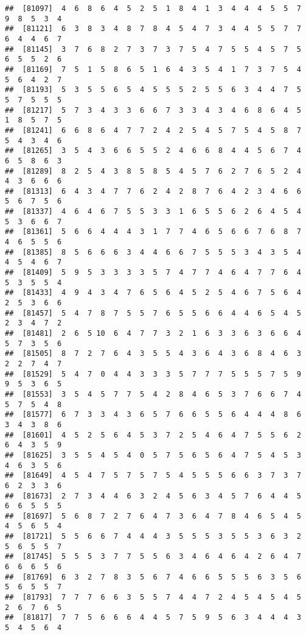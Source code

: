\documentclass[
]{book}
\begin{document}
\begin{verbatim}
##  [81097]  4  6  8  6  4  5  2  5  1  8  4  1  3  4  4  4  5  5  7  9  8  5  3  4
##  [81121]  6  3  8  3  4  8  7  8  4  5  4  7  3  4  4  5  5  7  7  6  4  4  6  7
##  [81145]  3  7  6  8  2  7  3  7  3  7  5  4  7  5  5  4  5  7  5  6  5  5  2  6
##  [81169]  7  5  1  5  8  6  5  1  6  4  3  5  4  1  7  3  7  5  4  5  6  4  2  7
##  [81193]  5  3  5  5  6  5  4  5  5  5  2  5  5  6  3  4  4  7  5  5  7  5  5  5
##  [81217]  5  7  3  4  3  3  6  6  7  3  3  4  3  4  6  8  6  4  5  1  8  5  7  5
##  [81241]  6  6  8  6  4  7  7  2  4  2  5  4  5  7  5  4  5  8  7  5  4  3  4  6
##  [81265]  3  5  4  3  6  6  5  5  2  4  6  6  8  4  4  5  6  7  4  6  5  8  6  3
##  [81289]  8  2  5  4  3  8  5  8  5  4  5  7  6  2  7  6  5  2  4  4  3  6  6  6
##  [81313]  6  4  3  4  7  7  6  2  4  2  8  7  6  4  2  3  4  6  6  5  6  7  5  6
##  [81337]  4  6  4  6  7  5  5  3  3  1  6  5  5  6  2  6  4  5  4  5  3  6  6  7
##  [81361]  5  6  6  4  4  4  3  1  7  7  4  6  5  6  6  7  6  8  7  4  6  5  5  6
##  [81385]  8  5  6  6  6  3  4  4  6  6  7  5  5  5  3  4  3  5  4  4  5  4  6  7
##  [81409]  5  9  5  3  3  3  3  5  7  4  7  7  4  6  4  7  7  6  4  5  3  5  5  4
##  [81433]  4  9  4  3  4  7  6  5  6  4  5  2  5  4  6  7  5  6  4  2  5  3  6  6
##  [81457]  5  4  7  8  7  5  5  7  6  5  5  6  6  4  4  6  5  4  5  2  3  4  7  2
##  [81481]  2  6  5 10  6  4  7  7  3  2  1  6  3  3  6  3  6  6  4  5  7  3  5  6
##  [81505]  8  7  2  7  6  4  3  5  5  4  3  6  4  3  6  8  4  6  3  2  2  7  4  7
##  [81529]  5  4  7  0  4  4  3  3  3  5  7  7  7  5  5  5  7  5  9  9  5  3  6  5
##  [81553]  3  5  4  5  7  7  5  4  2  8  4  6  5  3  7  6  6  7  4  5  7  5  4  8
##  [81577]  6  7  3  3  4  3  6  5  7  6  6  5  5  6  4  4  4  8  6  3  4  3  8  6
##  [81601]  4  5  2  5  6  4  5  3  7  2  5  4  6  4  7  5  5  6  2  6  4  3  5  9
##  [81625]  3  5  5  4  5  4  0  5  7  5  6  5  6  4  7  5  4  5  3  4  6  3  5  6
##  [81649]  4  5  4  7  5  7  5  7  5  4  5  5  5  6  6  3  7  3  7  6  2  3  3  6
##  [81673]  2  7  3  4  4  6  3  2  4  5  6  3  4  5  7  6  4  4  5  6  6  5  5  5
##  [81697]  5  6  8  7  2  7  6  4  7  3  6  4  7  8  4  6  5  4  5  4  5  6  5  4
##  [81721]  5  5  6  6  7  4  4  4  3  5  5  5  3  5  5  3  6  3  2  5  6  5  5  7
##  [81745]  5  5  5  3  7  7  5  5  6  3  4  6  4  6  4  2  6  4  7  6  6  6  5  6
##  [81769]  6  3  2  7  8  3  5  6  7  4  6  6  5  5  5  6  3  5  6  5  6  5  5  7
##  [81793]  7  7  7  6  6  3  5  5  7  4  4  7  2  4  5  4  5  4  5  2  6  7  6  5
##  [81817]  7  7  5  6  6  6  4  4  5  7  5  9  5  6  3  4  4  4  3  5  4  5  6  4

\end{verbatim}
\end{document}
